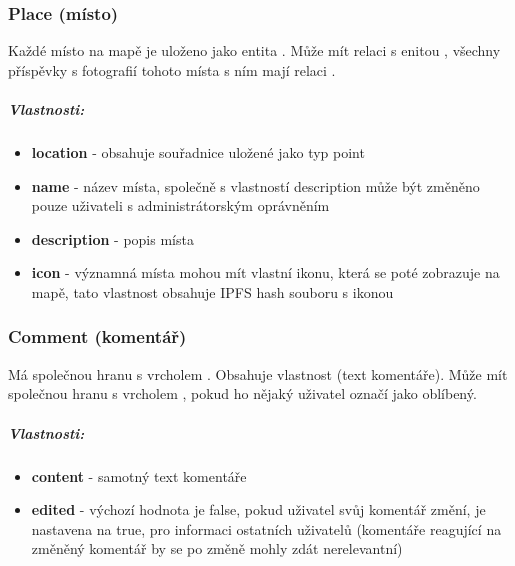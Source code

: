 \documentclass[12pt, a4paper,
 twoside,        %
 openright
]{report}
\newenvironment{propertiesItemize}{
\begin{itemize}{ 
  }}
  {\end{itemize}}
\begin{document}
    	            \subsubsection{Place (místo)} Každé místo na mapě je uloženo jako entita . Může mít relaci  s enitou , všechny příspěvky s fotografií tohoto místa s ním mají relaci .
    	             \subparagraph{Vlastnosti:}  
                           \begin{propertiesItemize}
                                \item \textbf{location} - obsahuje souřadnice uložené jako typ point \cite{Neo4jSparialFunctions}
                                \item \textbf{name} - název místa, společně s vlastností description může být změněno pouze uživateli s administrátorským oprávněním
                                \item \textbf{description} - popis místa
                                \item \textbf{icon} - významná místa mohou mít vlastní ikonu, která se poté zobrazuje na mapě, tato vlastnost obsahuje IPFS hash souboru s ikonou
                        \end{propertiesItemize}
    	            \subsubsection{Comment (komentář)} Má společnou hranu  s vrcholem . Obsahuje vlastnost  (text komentáře). Může mít společnou hranu  s vrcholem , pokud ho nějaký uživatel označí jako oblíbený.
    	                        \subparagraph{Vlastnosti:}  
                           \begin{propertiesItemize}
                                \item \textbf{content} - samotný text komentáře 
                                \item \textbf{edited} - výchozí hodnota je false, pokud uživatel svůj komentář změní, je nastavena na true, pro informaci ostatních uživatelů (komentáře reagující na změněný komentář by se po změně mohly zdát nerelevantní) 
                        \end{propertiesItemize}
\end{document}
